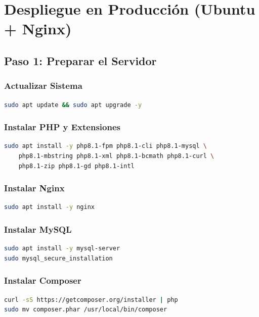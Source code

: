 \documentclass[12pt,a4paper]{article}
\begin{document}
\section{Despliegue en Producción (Ubuntu + Nginx)}

\subsection{Paso 1: Preparar el Servidor}

\subsubsection{Actualizar Sistema}
\begin{lstlisting}[language=bash]
sudo apt update && sudo apt upgrade -y
\end{lstlisting}

\subsubsection{Instalar PHP y Extensiones}
\begin{lstlisting}[language=bash]
sudo apt install -y php8.1-fpm php8.1-cli php8.1-mysql \
    php8.1-mbstring php8.1-xml php8.1-bcmath php8.1-curl \
    php8.1-zip php8.1-gd php8.1-intl
\end{lstlisting}

\subsubsection{Instalar Nginx}
\begin{lstlisting}[language=bash]
sudo apt install -y nginx
\end{lstlisting}

\subsubsection{Instalar MySQL}
\begin{lstlisting}[language=bash]
sudo apt install -y mysql-server
sudo mysql_secure_installation
\end{lstlisting}

\subsubsection{Instalar Composer}
\begin{lstlisting}[language=bash]
curl -sS https://getcomposer.org/installer | php
sudo mv composer.phar /usr/local/bin/composer
\end{lstlisting}
\end{document}
